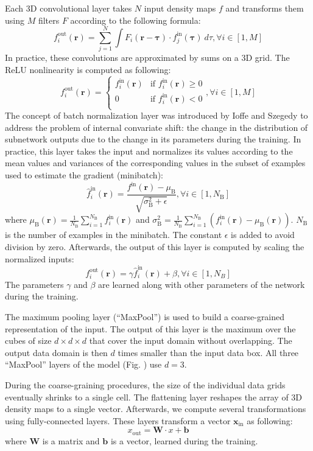 Each 3D convolutional layer takes $N$ input density maps $f$ and
transforms them using $M$ filters $F$ according to the following
formula:
$$
f^\text{out}_i (\mathbf{r}) = \sum^{N}_{j=1} \int F_i (\mathbf{r} - \mathbf{\tau}) \cdot f^\text{in}_j(\mathbf{\tau}) ~d\tau, \forall i \in [1,M]
$$
In practice, these convolutions are approximated by sums on a 3D grid.
The ReLU nonlinearity is computed as following:
$$
f^\text{out}_i (\mathbf{r}) = \begin{cases}
               f^\text{in}_i(\mathbf{r}) &\text{if } f^\text{in}_i(\mathbf{r})\geq 0\\
               0                         &\text{if } f^\text{in}_i(\mathbf{r})<0\\
            \end{cases}, \forall i \in [1,M]
$$
The concept of batch normalization layer was introduced by Ioffe and
Szegedy \cite{ioffe2015batch} to address the problem of internal
convariate shift: the change in the distribution of subnetwork outputs
due to the change in its parameters during the training. In practice,
this layer takes the input and normalizes its values according to the
mean values and variances of the corresponding values in the subset of
examples used to estimate the gradient (minibatch):
$$
\hat{f}^\text{in}_i(\mathbf{r}) = \frac{f^\text{in}(\mathbf{r}) - \mu_\text{B}}{\sqrt{\sigma^{2}_\text{B} + \epsilon}}, \forall i \in [1,N_\text{B}]
$$
where $\mu_\text{B}(\mathbf{r})
= \frac{1}{N_\text{B}} \sum_{i=1}^{N_\text{B}}
f^\text{in}_i(\mathbf{r})$ and $\sigma^{2}_\text{B}
= \frac{1}{N_\text{B}} \sum_{i=1}^{N_\text{B}} \left(
f^\text{in}_i(\mathbf{r}) - \mu_\text{B}
(\mathbf{r}) \right)$. $N_\text{B}$ is the number of examples in the
minibatch. The constant $\epsilon$ is added to avoid division by
zero. Afterwards, the output of this layer is computed by scaling the
normalized inputs:
$$
f^\text{out}_i(\mathbf{r}) = \gamma \hat{f}^\text{in}_i(\mathbf{r}) + \beta, \forall i \in [1,N_B]
$$
The parameters $\gamma$ and $\beta$ are learned along with other
parameters of the network during the training.

The maximum pooling layer (``MaxPool'') is used to build a
coarse-grained representation of the input. The output of this layer
is the maximum over the cubes of size $d \times d \times d$ that cover
the input domain without overlapping.  The output data domain is then
$d$ times smaller than the input data box. All three ``MaxPool''
layers of the model (Fig. \cite{Fig:CNNmodel}) use $d=3$.

During the coarse-graining procedures, the size of the individual data
grids eventually shrinks to a single cell. The flattening layer
reshapes the array of 3D density maps to a single vector. Afterwards,
we compute several transformations using fully-connected layers. These
layers transform a vector $\mathbf{x}_\text{in}$ as following:
$$
x_\text{out} = \mathbf{W} \cdot x + \mathbf{b}
$$
where $\mathbf{W}$ is a matrix and $\mathbf{b}$ is a vector, learned
during the training.
